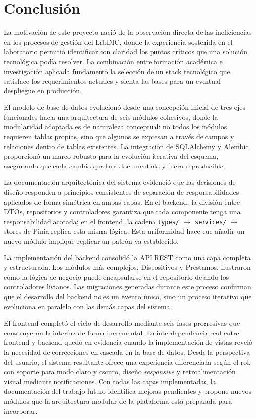 \section{Conclusión}\label{sec:conclusion_informe_final}

La motivación de este proyecto nació de la observación directa de las ineficiencias en los procesos de gestión del LabDIC, donde la experiencia sostenida en el laboratorio permitió identificar con claridad los puntos críticos que una solución tecnológica podía resolver. La combinación entre formación académica e investigación aplicada fundamentó la selección de un stack tecnológico que satisface los requerimientos actuales y sienta las bases para un eventual despliegue en producción.

El modelo de base de datos evolucionó desde una concepción inicial de tres ejes funcionales hacia una arquitectura de seis módulos cohesivos, donde la modularidad adoptada es de naturaleza conceptual: no todos los módulos requieren tablas propias, sino que algunos se expresan a través de campos y relaciones dentro de tablas existentes. La integración de SQLAlchemy y Alembic proporcionó un marco robusto para la evolución iterativa del esquema, asegurando que cada cambio quedara documentado y fuera reproducible.

La documentación arquitectónica del sistema evidenció que las decisiones de diseño responden a principios consistentes de separación de responsabilidades aplicados de forma simétrica en ambas capas. En el backend, la división entre DTOs, repositorios y controladores garantiza que cada componente tenga una responsabilidad acotada; en el frontend, la cadena \texttt{types/} $\rightarrow$ \texttt{services/} $\rightarrow$ stores de Pinia replica esta misma lógica. Esta uniformidad hace que añadir un nuevo módulo implique replicar un patrón ya establecido.

La implementación del backend consolidó la API REST como una capa completa y estructurada. Los módulos más complejos, Dispositivos y Préstamos, ilustraron cómo la lógica de negocio puede encapsularse en el repositorio dejando los controladores livianos. Las migraciones generadas durante este proceso confirman que el desarrollo del backend no es un evento único, sino un proceso iterativo que evoluciona en paralelo con las demás capas del sistema.

El frontend completó el ciclo de desarrollo mediante seis fases progresivas que construyeron la interfaz de forma incremental. La interdependencia real entre frontend y backend quedó en evidencia cuando la implementación de vistas reveló la necesidad de correcciones en cascada en la base de datos. Desde la perspectiva del usuario, el sistema resultante ofrece una experiencia diferenciada según el rol, con soporte para modo claro y oscuro, diseño \textit{responsive} y retroalimentación visual mediante notificaciones. Con todas las capas implementadas, la documentación del trabajo futuro identifica mejoras pendientes y propone nuevos módulos que la arquitectura modular de la plataforma está preparada para incorporar.